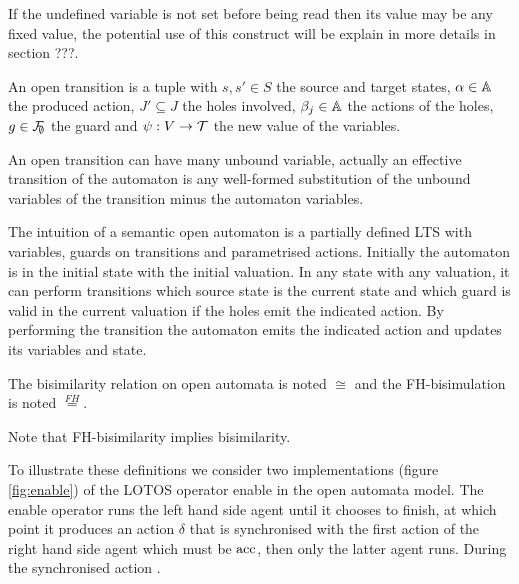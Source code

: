 \documentclass{article}
\begin{document}
If the undefined variable is not set before being read then its value may be any fixed value, the potential use of this construct will be explain in more details in section ???.
\begin{defi}
An open transition is a tuple \nmm{\OTg} with \(s, s' \in S\) the source and target states, \(\alpha \in {\mathbb{A}}\) the produced action, \(J' \subseteq J\) the holes involved, \(\beta_j \in {\mathbb{A}}\) the actions of the holes, \(g \in {\mathcal{F}}_{\!\!\emptyset}\) the guard and \(\psi: V \to {\mathcal{T}}\) the new value of the variables.
\end{defi}
An open transition can have many unbound variable, actually an effective transition of the automaton is any well-formed substitution of the unbound variables of the transition minus the automaton variables.

The intuition of a semantic open automaton is a partially defined LTS with variables, guards on transitions and parametrised actions.
Initially the automaton is in the initial state with the initial valuation.
In any state with any valuation, it can perform transitions which source state is the current state and which guard is valid in the current valuation if the holes emit the indicated action.
By performing the transition the automaton emits the indicated action and updates its variables and state.

\begin{noti}
The bisimilarity relation on open automata is noted \(\cong\) and the FH-bisimulation \cite{henrio:01055091} is noted \(\overset{FH}=\).
\end{noti}
Note that FH-bisimilarity implies bisimilarity.

To illustrate these definitions we consider  two implementations (figure \ref{fig:enable}) of the LOTOS \cite{ISOLOTOS} operator enable in the open automata model.
The enable operator runs  the left hand side agent until it chooses to finish, at which point it produces an action \(\delta\) that is synchronised with the first action of the right hand side agent which must be \(\mathrm{acc}\), then only the latter agent runs.
During the synchronised action .
\end{document}
